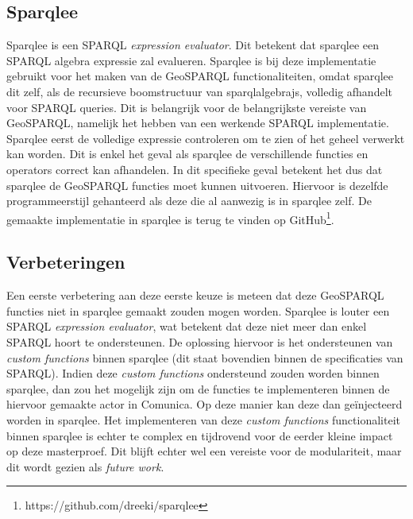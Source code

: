 \subsection{Sparqlee}
Sparqlee is een SPARQL \textit{expression evaluator}. Dit betekent dat sparqlee een SPARQL algebra expressie zal evalueren. Sparqlee is bij deze implementatie gebruikt voor het maken van de GeoSPARQL functionaliteiten, omdat sparqlee dit zelf, als de recursieve boomstructuur van sparqlalgebrajs, volledig afhandelt voor SPARQL queries. Dit is belangrijk voor de belangrijkste vereiste van GeoSPARQL, namelijk het hebben van een werkende SPARQL implementatie. Sparqlee eerst de volledige expressie controleren om te zien of het geheel verwerkt kan worden. Dit is enkel het geval als sparqlee de verschillende functies en operators correct kan afhandelen. In dit specifieke geval betekent het dus dat sparqlee de GeoSPARQL functies moet kunnen uitvoeren. Hiervoor is dezelfde programmeerstijl gehanteerd als deze die al aanwezig is in sparqlee zelf. De gemaakte implementatie in sparqlee is terug te vinden op GitHub\footnote{https://github.com/dreeki/sparqlee}.

\subsection{Verbeteringen}
Een eerste verbetering aan deze eerste keuze is meteen dat deze GeoSPARQL functies niet in sparqlee gemaakt zouden mogen worden. Sparqlee is louter een SPARQL \textit{expression evaluator}, wat betekent dat deze niet meer dan enkel SPARQL hoort te ondersteunen. De oplossing hiervoor is het ondersteunen van \textit{custom functions} binnen sparqlee (dit staat bovendien binnen de specificaties van SPARQL). Indien deze \textit{custom functions} ondersteund zouden worden binnen sparqlee, dan zou het mogelijk zijn om de functies te implementeren binnen de hiervoor gemaakte actor in Comunica. Op deze manier kan deze dan geïnjecteerd worden in sparqlee. Het implementeren van deze \textit{custom functions} functionaliteit binnen sparqlee is echter te complex en tijdrovend voor de eerder kleine impact op deze masterproef. Dit blijft echter wel een vereiste voor de modulariteit, maar dit wordt gezien als \textit{future work}.